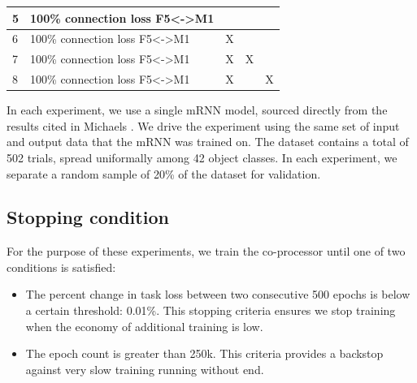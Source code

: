 \documentclass[12pt]{iopart}
\begin{document}
\begin{table}[h]
\begin{tabular}{|l|l|c|c|c|}
5              & 100\% connection loss F5\textless{}-\textgreater{}M1 &                                                                                                 &                                                                                                &                                                                                                 \\ \hline
6              & 100\% connection loss F5\textless{}-\textgreater{}M1 & X                                                                                               &                                                                                                &                                                                                                 \\ \hline
7              & 100\% connection loss F5\textless{}-\textgreater{}M1 & X                                                                                               & X                                                                                              &                                                                                                 \\ \hline
8              & 100\% connection loss F5\textless{}-\textgreater{}M1 & X                                                                                               &                                                                                                & X                                                                                               \\ \hline
\end{tabular}
\end{table}

In each experiment, we use a single mRNN model, sourced directly from the results
cited in Michaels \cite{michaels.mrnn}. We drive the experiment using the same set of
input and output data that the mRNN was trained on. The dataset contains a total of
502 trials, spread uniformally among 42 object classes. In each experiment, we separate
a random sample of 20\% of the dataset for validation.

\subsection{Stopping condition}
For the purpose of these experiments, we train the co-processor until one of two
conditions is satisfied:

\begin{itemize}
	\item The percent change in task loss between two consecutive 500 epochs is below a certain threshold: 0.01\%. This
	      stopping criteria ensures we stop training when the economy of additional training is low.
	\item The epoch count is greater than 250k. This criteria provides a backstop against very slow training running without end.
\end{itemize}
\end{document}
